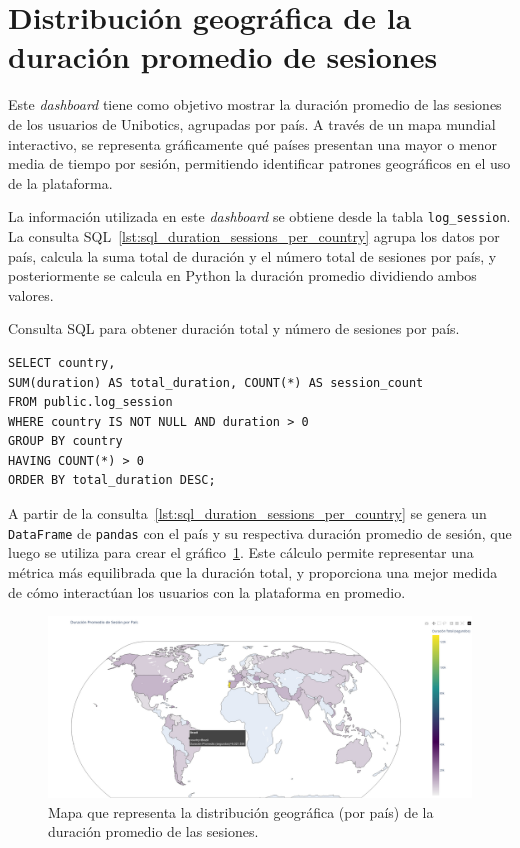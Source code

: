 \documentclass[a4paper, 12pt]{book}
\begin{document}
\section{Distribución geográfica de la duración promedio de sesiones}
\label{sec:dash1c}

Este \textit{dashboard} tiene como objetivo mostrar la duración promedio de las sesiones de los usuarios de Unibotics, agrupadas por país. A través de un mapa mundial interactivo, se representa gráficamente qué países presentan una mayor o menor media de tiempo por sesión, permitiendo identificar patrones geográficos en el uso de la plataforma.

La información utilizada en este \textit{dashboard} se obtiene desde la tabla \texttt{log\_session}. La consulta SQL~\ref{lst:sql_duration_sessions_per_country} agrupa los datos por país, calcula la suma total de duración y el número total de sesiones por país, y posteriormente se calcula en Python la duración promedio dividiendo ambos valores.

\begin{listing}[h!]
\caption{Consulta SQL para obtener duración total y número de sesiones por país.}
\label{lst:sql_duration_sessions_per_country}
\begin{verbatim}
SELECT country, 
SUM(duration) AS total_duration, COUNT(*) AS session_count 
FROM public.log_session
WHERE country IS NOT NULL AND duration > 0
GROUP BY country
HAVING COUNT(*) > 0  
ORDER BY total_duration DESC;
\end{verbatim}
\end{listing}

A partir de la consulta~\ref{lst:sql_duration_sessions_per_country} se genera un \texttt{DataFrame} de \texttt{pandas} con el país y su respectiva duración promedio de sesión, que luego se utiliza para crear el gráfico~\ref{fig:1c}. Este cálculo permite representar una métrica más equilibrada que la duración total, y proporciona una mejor medida de cómo interactúan los usuarios con la plataforma en promedio.

\begin{figure}[H]
  \centering
  \includegraphics[width=1.1\textwidth]{img/1c.png}
  \caption{Mapa que representa la distribución geográfica (por país) de la duración promedio de las sesiones.}
  \label{fig:1c}
\end{figure}
\end{document}
